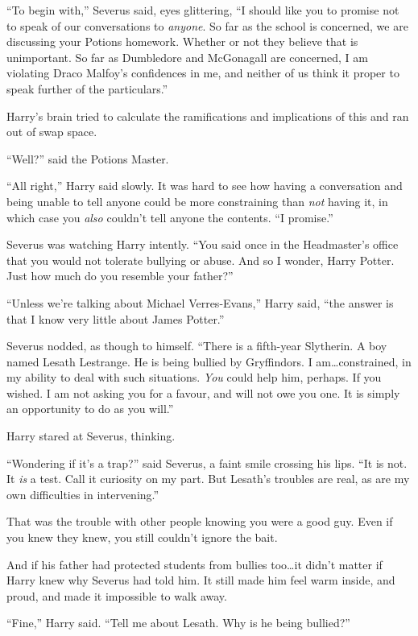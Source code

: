 “To begin with,” Severus said, eyes glittering, “I should like you to promise not to speak of our conversations to \emph{anyone}. So far as the school is concerned, we are discussing your Potions homework. Whether or not they believe that is unimportant. So far as Dumbledore and McGonagall are concerned, I am violating Draco Malfoy’s confidences in me, and neither of us think it proper to speak further of the particulars.”

Harry’s brain tried to calculate the ramifications and implications of this and ran out of swap space.

“Well?” said the Potions Master.

“All right,” Harry said slowly. It was hard to see how having a conversation and being unable to tell anyone could be more constraining than \emph{not} having it, in which case you \emph{also} couldn’t tell anyone the contents. “I promise.”

Severus was watching Harry intently. “You said once in the Headmaster’s office that you would not tolerate bullying or abuse. And so I wonder, Harry Potter. Just how much do you resemble your father?”

“Unless we’re talking about Michael Verres-Evans,” Harry said, “the answer is that I know very little about James Potter.”

Severus nodded, as though to himself. “There is a fifth-year Slytherin. A boy named Lesath Lestrange. He is being bullied by Gryffindors. I am…constrained, in my ability to deal with such situations. \emph{You} could help him, perhaps. If you wished. I am not asking you for a favour, and will not owe you one. It is simply an opportunity to do as you will.”

Harry stared at Severus, thinking.

“Wondering if it’s a trap?” said Severus, a faint smile crossing his lips. “It is not. It \emph{is} a test. Call it curiosity on my part. But Lesath’s troubles are real, as are my own difficulties in intervening.”

That was the trouble with other people knowing you were a good guy. Even if you knew they knew, you still couldn’t ignore the bait.

And if his father had protected students from bullies too…it didn’t matter if Harry knew why Severus had told him. It still made him feel warm inside, and proud, and made it impossible to walk away.

“Fine,” Harry said. “Tell me about Lesath. Why is he being bullied?”

